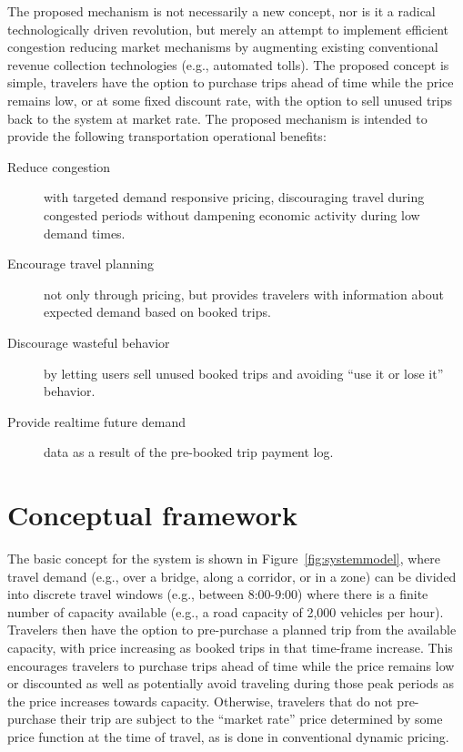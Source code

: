 \documentclass[10pt, letter, twocolumn]{article} %
\begin{document}
The proposed mechanism is not necessarily a new concept, nor is it a radical technologically driven revolution, but merely an attempt to implement efficient congestion reducing market mechanisms by augmenting existing conventional revenue collection technologies (e.g., automated tolls). The proposed concept is simple, travelers have the option to purchase trips ahead of time while the price remains low, or at some fixed discount rate, with the option to sell unused trips back to the system at market rate. The proposed mechanism is intended to provide the following transportation operational benefits:
\begin{description}
	\item[Reduce congestion] with targeted demand responsive pricing, discouraging travel during congested periods without dampening economic activity during low demand times.
	
	\item[Encourage travel planning] not only through pricing, but provides travelers with information about expected demand based on booked trips.
	
	\item[Discourage wasteful behavior] by letting users sell unused booked trips and avoiding ``use it or lose it'' behavior.
	
	\item[Provide realtime future demand] data as a result of the pre-booked trip payment log.
\end{description}



\section{Conceptual framework}
The basic concept for the system is shown in Figure~\ref{fig:systemmodel}, where travel demand (e.g., over a bridge, along a corridor, or in a zone) can be divided into discrete travel windows (e.g., between 8:00-9:00) where there is a finite number of capacity available (e.g., a road capacity of 2,000 vehicles per hour). Travelers then have the option to pre-purchase a planned trip from the available capacity, with price increasing as booked trips in that time-frame increase. This encourages travelers to purchase trips ahead of time while the price remains low or discounted as well as potentially avoid traveling during those peak periods as the price increases towards capacity. Otherwise, travelers that do not pre-purchase their trip are subject to the ``market rate'' price determined by some price function at the time of travel, as is done in conventional dynamic pricing.
\end{document}
